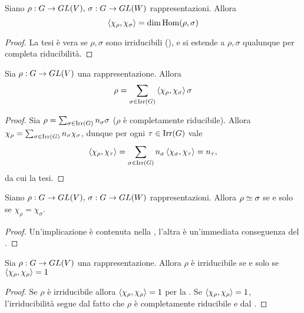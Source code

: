 \begin{corollary}
Siano $\rho:G\to GL(V),\,\allowbreak\sigma:G\to GL(W)$ rappresentazioni. Allora
$$
\left\langle\chi_\rho,\chi_\sigma\right\rangle=\dim\operatorname{Hom}(\rho,\sigma)
$$
\end{corollary}
\begin{proof}
La tesi è vera se $\rho\comma\sigma$ sono irriducibili (), e si estende a $\rho\comma\sigma$ qualunque per completa riducibilità.
\end{proof}

\begin{corollary}
Sia $\rho:G\to GL(V)$ una rappresentazione. Allora
$$
\rho=\sum_{\sigma\in\operatorname{Irr}(G)}\left\langle\chi_\rho,\chi_\sigma\right\rangle\sigma
$$
\end{corollary}
\begin{proof}
Sia $\rho=\sum_{\sigma\in\operatorname{Irr}(G)}n_\sigma\sigma$ ($\rho$ è completamente riducibile). Allora $\chi_\rho=\sum_{\sigma\in\operatorname{Irr}(G)}n_\sigma\chi_\sigma$, dunque per ogni $\tau\in\operatorname{Irr}(G)$ vale
$$
\left\langle\chi_\rho,\chi_\tau\right\rangle=\sum_{\sigma\in\operatorname{Irr}(G)}n_\sigma\left\langle\chi_\sigma,\chi_\tau\right\rangle=n_\tau,
$$
da cui la tesi.
\end{proof}

\begin{corollary}
Siano $\rho:G\to GL(V),\,\allowbreak\sigma:G\to GL(W)$ rappresentazioni. Allora $\rho\simeq\sigma$ se e solo se $\chi_\rho=\chi_\sigma$.
\end{corollary}
\begin{proof}
Un'implicazione è contenuta nella , l'altra è un'immediata conseguenza del .
\end{proof}

\begin{corollary}
Sia $\rho:G\to GL(V)$ una rappresentazione. Allora $\rho$ è irriducibile se e solo se $\left\langle\chi_\rho,\chi_\rho\right\rangle=1$
\end{corollary}
\begin{proof}
Se $\rho$ è irriducibile allora $\left\langle\chi_\rho,\chi_\rho\right\rangle=1$ per la . Se $\left\langle\chi_\rho,\chi_\rho\right\rangle=1$, l'irriducibilità segue dal fatto che $\rho$ è completamente riducibile e dal .
\end{proof}

